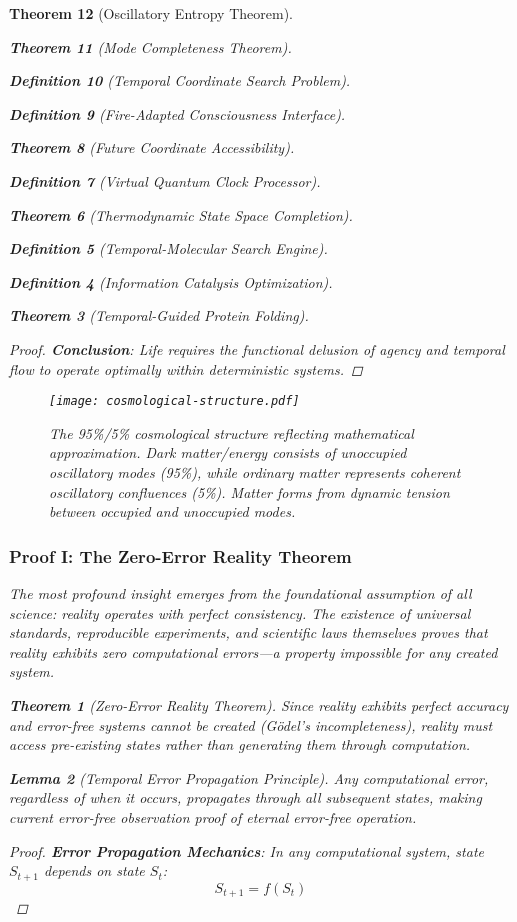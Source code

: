 \documentclass[12pt,a4paper]{article}
\newtheorem{theorem}{Theorem}[section]
\newtheorem{lemma}[theorem]{Lemma}
\newtheorem{definition}[theorem]{Definition}
\begin{document}
\begin{theorem}[Oscillatory Entropy Theorem]
\begin{theorem}[Mode Completeness Theorem]
\begin{enumerate}
\begin{definition}[Temporal Coordinate Search Problem]
\begin{algorithm}
\begin{definition}[Fire-Adapted Consciousness Interface]
\begin{theorem}[Future Coordinate Accessibility]
\begin{definition}[Virtual Quantum Clock Processor]
\begin{itemize}
\begin{itemize}
\begin{theorem}[Thermodynamic State Space Completion]
\begin{definition}[Temporal-Molecular Search Engine]
\begin{definition}[Information Catalysis Optimization]
\begin{algorithm}
\begin{theorem}[Temporal-Guided Protein Folding]
\begin{table}[h]
\begin{proof}
\textbf{Conclusion}: Life requires the functional delusion of agency and temporal flow to operate optimally within deterministic systems.
\end{proof}

\begin{figure}[h]
\centering
\texttt{[image: cosmological-structure.pdf]}
\caption{The 95\%/5\% cosmological structure reflecting mathematical approximation. Dark matter/energy consists of unoccupied oscillatory modes (95\%), while ordinary matter represents coherent oscillatory confluences (5\%). Matter forms from dynamic tension between occupied and unoccupied modes.}
\label{fig:cosmological-structure}
\end{figure}

\subsubsection{Proof I: The Zero-Error Reality Theorem}

The most profound insight emerges from the foundational assumption of all science: reality operates with perfect consistency. The existence of universal standards, reproducible experiments, and scientific laws themselves proves that reality exhibits zero computational errors—a property impossible for any created system.

\begin{theorem}[Zero-Error Reality Theorem]
Since reality exhibits perfect accuracy and error-free systems cannot be created (Gödel's incompleteness), reality must access pre-existing states rather than generating them through computation.
\end{theorem}

\begin{lemma}[Temporal Error Propagation Principle]
Any computational error, regardless of when it occurs, propagates through all subsequent states, making current error-free observation proof of eternal error-free operation.
\end{lemma}

\begin{proof}
\textbf{Error Propagation Mechanics}: In any computational system, state $S_{t+1}$ depends on state $S_t$:
$$S_{t+1} = f(S_t)$$


\end{proof}
\end{table}
\end{theorem}
\end{algorithm}
\end{definition}
\end{definition}
\end{theorem}
\end{itemize}
\end{itemize}
\end{definition}
\end{theorem}
\end{definition}
\end{algorithm}
\end{definition}
\end{enumerate}
\end{theorem}
\end{theorem}
\end{document}

